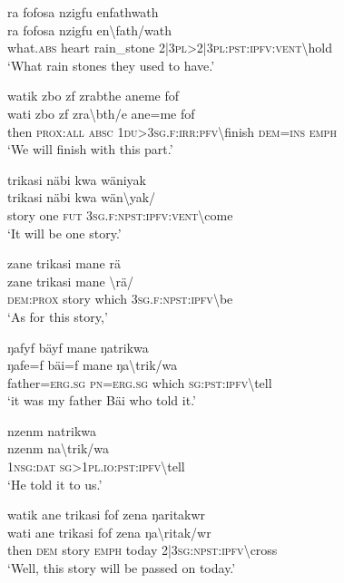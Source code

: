 \ea\label{ex:1:a3472}
ra fofosa nzigfu enfathwath\\
\gll ra	fofosa	nzigfu	en{\textbackslash}fath/wath\\
     what.\textsc{abs}	heart	rain\_stone	2|3\textsc{pl}>2|3\textsc{pl}:\textsc{pst}:\textsc{ipfv}:\textsc{vent}{\textbackslash}hold\\
\glt `What rain stones they used to have.'
\z

\ea\label{ex:1:a3474}
watik zbo zf zrabthe aneme fof\\
\gll wati	zbo	zf	zra{\textbackslash}bth/e	ane=me	fof\\
     then	\textsc{prox}:\textsc{all}	\textsc{absc}	1\textsc{du}>3\textsc{sg}.\textsc{f}:\textsc{irr}:\textsc{pfv}{\textbackslash}finish	\textsc{dem}=\textsc{ins}	\textsc{emph}\\
\glt `We will finish with this part.'
\z

\ea\label{ex:1:a3476}
trikasi näbi kwa wäniyak\\
\gll trikasi	näbi	kwa	wän{\textbackslash}yak/\\
     story	one	\textsc{fut}	3\textsc{sg}.\textsc{f}:\textsc{npst}:\textsc{ipfv}:\textsc{vent}{\textbackslash}come\\
\glt `It will be one story.'
\z

\ea\label{ex:1:a3481}
zane trikasi mane rä\\
\gll zane	trikasi	mane	{\textbackslash}rä/\\
     \textsc{dem}:\textsc{prox}	story	which	3\textsc{sg}.\textsc{f}:\textsc{npst}:\textsc{ipfv}{\textbackslash}be\\
\glt `As for this story,'
\z

\ea\label{ex:1:a3483}
ŋafyf bäyf mane ŋatrikwa\\
\gll ŋafe=f	bäi=f	mane	ŋa{\textbackslash}trik/wa\\
     father=\textsc{erg}.\textsc{sg}	\textsc{pn}=\textsc{erg}.\textsc{sg}	which	\textsc{sg}:\textsc{pst}:\textsc{ipfv}{\textbackslash}tell\\
\glt `it was my father Bäi who told it.'
\z

\ea\label{ex:1:a3484}
nzenm natrikwa\\
\gll nzenm	na{\textbackslash}trik/wa\\
     1\textsc{nsg}:\textsc{dat}	\textsc{sg}>1\textsc{pl}.\textsc{io}:\textsc{pst}:\textsc{ipfv}{\textbackslash}tell\\
\glt `He told it to us.'
\z

\ea\label{ex:1:a3485}
watik ane trikasi fof zena ŋaritakwr\\
\gll wati	ane	trikasi	fof	zena	ŋa{\textbackslash}ritak/wr\\
     then	\textsc{dem}	story	\textsc{emph}	today	2|3\textsc{sg}:\textsc{npst}:\textsc{ipfv}{\textbackslash}cross\\
\glt `Well, this story will be passed on today.'
\z

